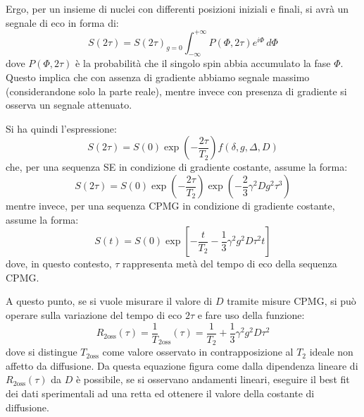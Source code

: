 Ergo, per un insieme di nuclei con differenti posizioni iniziali e finali, si avrà un segnale di eco in forma di:
\begin{equation}
	S(2\tau) = S(2\tau)_{g=0}\int_{-\infty}^{+\infty} P(\Phi,2\tau)e^{i\Phi}\,d\Phi
\end{equation}
dove $P(\Phi,2\tau)$ è la probabilità che il singolo spin abbia accumulato la fase $\Phi$. Questo implica che con assenza di gradiente abbiamo segnale massimo (considerandone solo la parte reale), mentre invece con presenza di gradiente si osserva un segnale attenuato.

Si ha quindi l'espressione:
\begin{equation}
	S(2\tau) = S(0) \exp\left(-\frac{2\tau}{T_2}\right) f(\delta,g,\Delta,D)
\end{equation}
che, per una sequenza SE in condizione di gradiente costante, assume la forma:
\begin{equation}
	S(2\tau) = S(0)\exp(-\frac{2\tau}{T_2})\exp(-\frac{2}{3}\gamma^2Dg^2\tau^3)
\end{equation}
mentre invece, per una sequenza CPMG in condizione di gradiente costante, assume la forma:
\begin{equation}
	S(t) = S(0)\exp\left[-\frac{t}{T_2}-\frac{1}{3}\gamma^2 g^2 D\tau^2 t\right]
\end{equation}
dove, in questo contesto, $\tau$ rappresenta metà del tempo di eco della sequenza CPMG.

A questo punto, se si vuole misurare il valore di $D$ tramite misure CPMG, si può operare sulla variazione del tempo di eco $2\tau$ e fare uso della funzione:
\begin{equation}
	R_{\text{2oss}}(\tau) = \frac{1}{T}_{\text{2oss}}(\tau)=\frac{1}{T_2}+\frac{1}{3}\gamma^2g^2D\tau^2
\end{equation}
dove si distingue $T_{\text{2oss}}$ come valore osservato in contrapposizione al $T_2$ ideale non affetto da diffusione. Da questa equazione figura come dalla dipendenza lineare di $R_{\text{2oss}}(\tau)$ da $D$ è possibile, se si osservano andamenti lineari, eseguire il best fit dei dati sperimentali ad una retta ed ottenere il valore della costante di diffusione.

